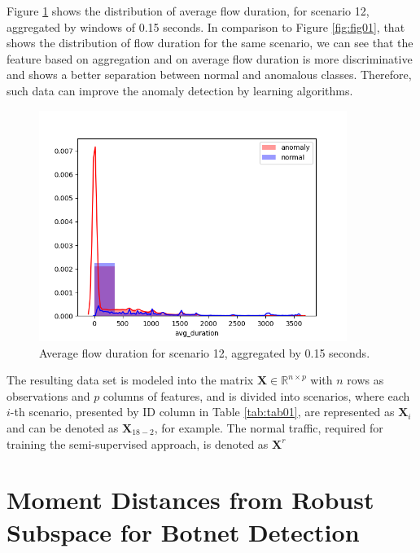 \documentclass[review]{elsarticle}
\begin{document}
Figure \ref{fig:fig02} shows the distribution of average flow duration, for scenario 12, aggregated by windows of 0.15 seconds. In comparison to Figure \ref{fig:fig01}, that shows the distribution of flow duration for the same scenario, we can see that the feature based on aggregation and on average flow duration is more discriminative and shows a better separation between normal and anomalous classes. Therefore, such data can improve the anomaly detection by learning algorithms.

\begin{figure}[h!]
     \centering
     \includegraphics[width=10cm]{figures/agg_distplot_0_15s_12_avg_duration.png}
     \caption{Average flow duration for scenario 12, aggregated by 0.15 seconds.}
     \label{fig:fig02}
\end{figure}

The resulting data set is modeled into the matrix $\boldsymbol{X} \in \mathbb{R}^{n \times p}$ with $n$ rows as observations and $p$ columns of features, and is divided into scenarios, where each $i$-th scenario, presented by ID column in Table \ref{tab:tab01}, are represented as $\boldsymbol{X}_i$ and can be denoted as $\boldsymbol{X}_{18-2}$, for example. The normal traffic, required for training the semi-supervised approach, is denoted as $\boldsymbol{X}^r$

\section{Moment Distances from Robust Subspace for Botnet Detection}
\label{sec:mdrs}
\end{document}
